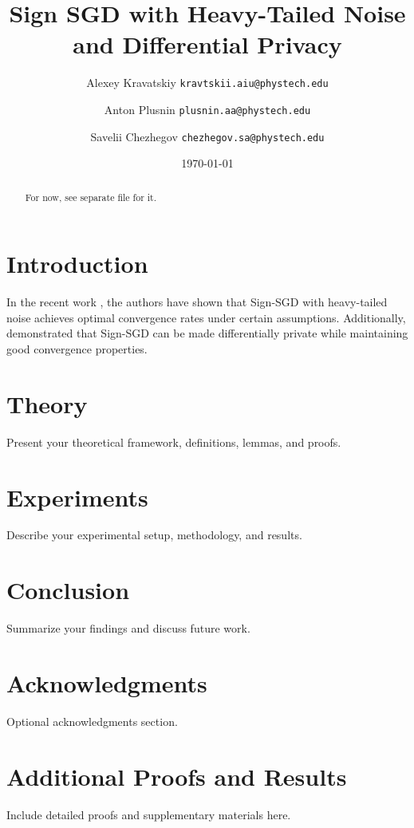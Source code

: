 \documentclass{article}
\title{Sign SGD with Heavy-Tailed Noise and Differential Privacy}
\author{
Alexey Kravatskiy
\texttt{kravtskii.aiu@phystech.edu}
\and
Anton Plusnin
\texttt{plusnin.aa@phystech.edu}
\and
Savelii Chezhegov
\texttt{chezhegov.sa@phystech.edu}
}
\date{\today}
\begin{document}
\maketitle

\begin{abstract}
For now, see separate file for it.
\end{abstract}

\section{Introduction}
In the recent work \cite{Kornilov2025}, the authors have shown that Sign-SGD with heavy-tailed noise achieves optimal convergence rates under certain assumptions. Additionally, \cite{Jin2021} demonstrated that Sign-SGD can be made differentially private while maintaining good convergence properties.

\section{Theory}
Present your theoretical framework, definitions, lemmas, and proofs.

\section{Experiments}
Describe your experimental setup, methodology, and results.

\section{Conclusion}
Summarize your findings and discuss future work.

\section*{Acknowledgments}
Optional acknowledgments section.


\appendix
\section{Additional Proofs and Results}
Include detailed proofs and supplementary materials here.

\printbibliography
\end{document}
